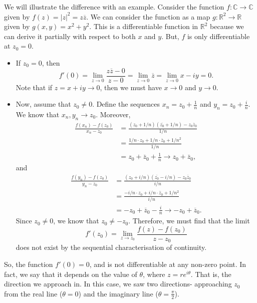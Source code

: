 \documentclass[a4paper, openany]{memoir}
\theoremstyle{definition}
\theoremstyle{plain}
\begin{document}
We will illustrate the difference with an example. Consider the function $f: \mathbb{C} \to \mathbb{C}$ given by $f(z) = |z|^2 = z \overline{z}$. We can consider the function as a map $g: \mathbb{R}^2 \to \mathbb{R}$ given by $g(x, y) = x^2 + y^2$. This is a differentiable function in $\mathbb{R}^2$ because we can derive it partially with respect to both $x$ and $y$. But, $f$ is only differentiable at $z_0 = 0$. 
\begin{itemize}
    \item If $z_0 = 0$, then
    \[f'(0) = \lim_{z \to 0} \frac{z \overline{z} - 0}{z - 0} = \lim_{z \to 0} \overline{z} = \lim_{z \to 0} x - iy = 0.\]
    Note that if $z = x + iy \to 0$, then we must have $x \to 0$ and $y \to 0$.
    
    \item Now, assume that $z_0 \neq 0$. Define the sequences $x_n = z_0 + \frac{1}{n}$ and $y_n = z_0 + \frac{i}{n}$. We know that $x_n, y_n \to z_0$. Moreover,
    \begin{align*}
        \frac{f(x_n) - f(z_0)}{x_n - z_0} &= \frac{(z_0 + 1/n)(\overline{z_0} + 1/n) - z_0 \overline{z}_0}{1/n} \\
        &= \frac{1/n \cdot z_0 + 1/n \cdot \overline{z}_0 + 1/n^2}{1/n} \\
        &= z_0 + \overline{z}_0 + \frac{1}{n} \to z_0 + \overline{z}_0,
    \end{align*}
    and
    \begin{align*}
        \frac{f(y_n) - f(z_0)}{y_n - z_0} &= \frac{(z_0 + i/n)(\overline{z_0} - i/n) - z_0 \overline{z}_0}{i/n} \\
        &= \frac{-i/n \cdot z_0 + i/n \cdot \overline{z}_0 + 1/n^2}{i/n} \\
        &= -z_0 + \overline{z}_0 - \frac{i}{n} \to -z_0 + \overline{z}_0.
    \end{align*}
    Since $z_0 \neq 0$, we know that $z_0 \neq -z_0$. Therefore, we must find that the limit
    \[f'(z_0) = \lim_{z \to z_0} \frac{f(z) - f(z_0)}{z - z_0}\]
    does not exist by the sequential characterisation of continuity.
\end{itemize}
So, the function $f'(0) = 0$, and is not differentiable at any non-zero point. In fact, we say that it depends on the value of $\theta$, where $z = re^{i \theta}$. That is, the direction we approach in. In this case, we saw two directions- approaching $z_0$ from the real line ($\theta = 0$) and the imaginary line ($\theta = \frac{\pi}{2}$).
\end{document}
